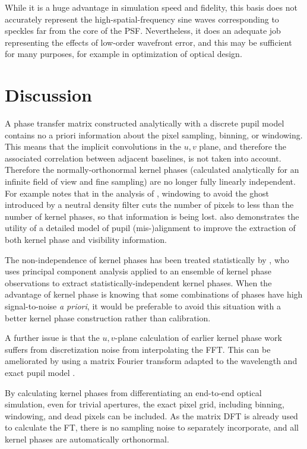 \documentclass[modern]{aastex63}
\begin{document}
While it is a huge advantage in simulation speed and fidelity, this basis does not accurately represent the high-spatial-frequency sine waves corresponding to speckles far from the core of the PSF. Nevertheless, it does an adequate job representing the effects of low-order wavefront error, and this may be sufficient for many purposes, for example in optimization of optical design.

\section{Discussion}
\label{sec:discussion}

A phase transfer matrix constructed analytically with a discrete pupil model contains no a priori information about the pixel sampling, binning, or windowing. This means that the implicit convolutions in the $u,v$ plane, and therefore the associated correlation between adjacent baselines, is not taken into account.  Therefore the normally-orthonormal kernel phases (calculated analytically for an infinite field of view and fine sampling) are no longer fully linearly independent. For example \citet{martinache20} notes that in the analysis of \citet{palomar}, windowing to avoid the ghost introduced by a neutral density filter cuts the number of pixels to less than the number of kernel phases, so that information is being lost. \citet{martinache20} also demonstrates the utility of a detailed model of pupil (mis-)alignment to improve the extraction of both kernel phase and visibility information.

The non-independence of kernel phases has been treated statistically by \citet{ireland13}, who uses principal component analysis applied to an ensemble of kernel phase observations to extract statistically-independent kernel phases. When the advantage of kernel phase is knowing that some combinations of phases have high signal-to-noise \textit{a priori}, it would be preferable to avoid this situation with a better kernel phase construction rather than calibration.

A further issue is that the $u,v$-plane calculation of earlier kernel phase work suffers from discretization noise from interpolating the FFT. This can be ameliorated by using a matrix Fourier transform adapted to the wavelength and exact pupil model \citep{martinache_habilitation}.

By calculating kernel phases from differentiating an end-to-end optical simulation, even for trivial apertures, the exact pixel grid, including binning, windowing, and dead pixels can be included. As the matrix DFT is already used to calculate the FT, there is no sampling noise to separately incorporate, and all kernel phases are automatically orthonormal.
\end{document}
